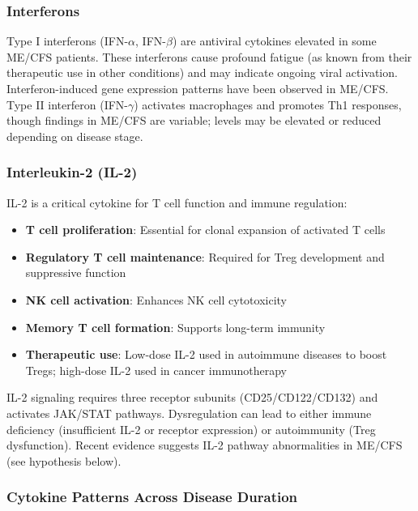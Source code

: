 \subsubsection{Interferons}

Type I interferons (IFN-$\alpha$, IFN-$\beta$) are antiviral cytokines elevated in some ME/CFS patients. These interferons cause profound fatigue (as known from their therapeutic use in other conditions) and may indicate ongoing viral activation. Interferon-induced gene expression patterns have been observed in ME/CFS. Type II interferon (IFN-$\gamma$) activates macrophages and promotes Th1 responses, though findings in ME/CFS are variable; levels may be elevated or reduced depending on disease stage.

\subsubsection{Interleukin-2 (IL-2)}

IL-2 is a critical cytokine for T cell function and immune regulation:
\begin{itemize}
    \item \textbf{T cell proliferation}: Essential for clonal expansion of activated T cells
    \item \textbf{Regulatory T cell maintenance}: Required for Treg development and suppressive function
    \item \textbf{NK cell activation}: Enhances NK cell cytotoxicity
    \item \textbf{Memory T cell formation}: Supports long-term immunity
    \item \textbf{Therapeutic use}: Low-dose IL-2 used in autoimmune diseases to boost Tregs; high-dose IL-2 used in cancer immunotherapy
\end{itemize}

IL-2 signaling requires three receptor subunits (CD25/CD122/CD132) and activates JAK/STAT pathways. Dysregulation can lead to either immune deficiency (insufficient IL-2 or receptor expression) or autoimmunity (Treg dysfunction). Recent evidence suggests IL-2 pathway abnormalities in ME/CFS (see hypothesis below).

\subsubsection{Cytokine Patterns Across Disease Duration}

